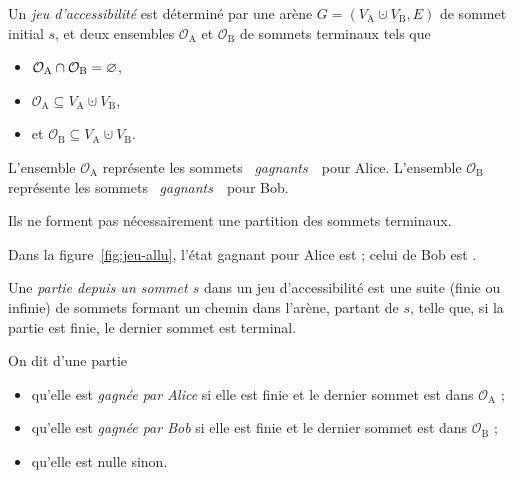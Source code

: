 \begin{defn}
	Un \textit{jeu d'accessibilité} est déterminé par une arène $G = (V_\mathrm{A} \cupdot V_\mathrm{B}, E)$ de sommet initial $s$, et deux ensembles $\mathcal{O}_\mathrm{A}$\/ et $\mathcal{O}_\mathrm{B}$\/ de sommets terminaux tels que
	\begin{itemize}
		\item $\mathcal{O}_\mathrm{A} \cap \mathcal{O}_\mathrm{B} = \varnothing$,
		\item $\mathcal{O}_\mathrm{A} \subseteq V_\mathrm{A} \cupdot V_\mathrm{B}$,
		\item et $\mathcal{O}_\mathrm{B} \subseteq  V_\mathrm{A} \cupdot V_\mathrm{B}$.
	\end{itemize}
	L'ensemble $\mathcal{O}_\mathrm{A}$\/ représente les sommets \guillemotleft~\textit{gagnants}~\guillemotright\ pour Alice.
	L'ensemble $\mathcal{O}_\mathrm{B}$\/ représente les sommets \guillemotleft~\textit{gagnants}~\guillemotright\ pour Bob.
\end{defn}

\begin{rmk}
	Ils ne forment pas nécessairement une partition des sommets terminaux.
\end{rmk}

\begin{exm}
	Dans la figure~\ref{fig:jeu-allu}, l'état gagnant pour Alice est 
	{}
	; celui de Bob est 
	{}.
\end{exm}

\begin{defn}
	Une \textit{partie depuis un sommet $s$} dans un jeu d'accessibilité est une suite (finie ou infinie) de sommets formant un chemin dans l'arène, partant de $s$, telle que, si la partie est finie, le dernier sommet est terminal.

	On dit d'une partie
	\begin{itemize}
		\item qu'elle est \textit{gagnée par Alice} si elle est finie et le dernier sommet est dans $\mathcal{O}_\mathrm{A}$\/ ;
		\item qu'elle est \textit{gagnée par Bob} si elle est finie et le dernier sommet est dans $\mathcal{O}_\mathrm{B}$\/ ;
		\item qu'elle est nulle sinon.
	\end{itemize}
\end{defn}

